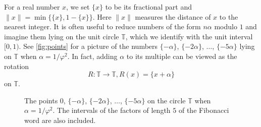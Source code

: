 \documentclass[a4paper,fleqn]{article}
\providecommand{\norm}[1]{\lVert#1\rVert}
\newcommand{\T}{\mathbb{T}}
\begin{document}
  For a real number $x$, we set $\{x\}$ to be its fractional part and $\norm{x} = \min\{\{x\}, 1 - \{x\}\}$. Here
  $\norm{x}$ measures the distance of $x$ to the nearest integer. It is often useful to reduce numbers of the form
  $n\alpha$ modulo $1$ and imagine them lying on the unit circle $\T$, which we identify with the unit interval
  $[0, 1)$. See \autoref{fig:points} for a picture of the numbers $\{-\alpha\}$, $\{-2\alpha\}$, $\ldots$,
  $\{-5\alpha\}$ lying on $\T$ when $\alpha = 1/\varphi^2$. In fact, adding $\alpha$ to its multiple can be viewed as
  the rotation
  \begin{equation*}
    R\colon \T \to \T, R(x) = \{x + \alpha\}
  \end{equation*}
  on $\T$.

  \begin{figure}
   \centering
   \caption{The points $0$, $\{-\alpha\}$, $\{-2\alpha\}$, $\ldots$, $\{-5\alpha\}$ on the circle $\T$ when
            $\alpha = 1/\varphi^2$. The intervals of the factors of length $5$ of the Fibonacci word are also
            included.}
   \label{fig:points}
  \end{figure}
 
\end{document}
